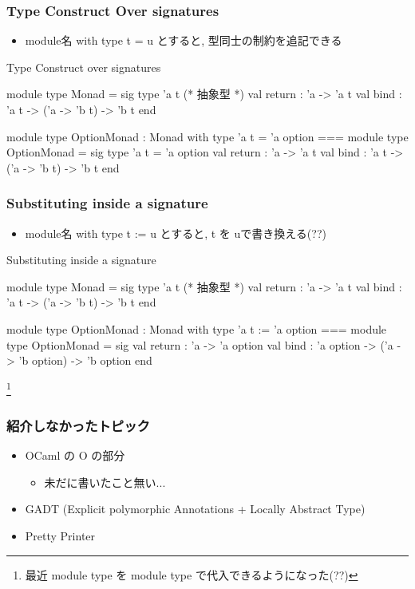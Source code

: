 \documentclass[dvipdfmx,14pt,notheorems,aspectratio=169]{beamer}
\theoremstyle{definition}
\begin{document}
    \begin{frame}[fragile]\frametitle{Type Construct Over signatures}
        \begin{itemize}
            \item module名 with type t = u とすると, 型同士の制約を追記できる
        \end{itemize}
        \begin{exampleblock}{Type Construct over signatures}
            \scriptsize
            \begin{verbatimtab}
module type Monad = sig
    type 'a t (* 抽象型 *)
    val return : 'a -> 'a t
    val bind : 'a t -> ('a -> 'b t) -> 'b t
end

module type OptionMonad : Monad with type 'a t = 'a option
===
module type OptionMonad =
  sig
    type 'a t = 'a option
    val return : 'a -> 'a t
    val bind : 'a t -> ('a -> 'b t) -> 'b t
  end
            \end{verbatimtab}
        \end{exampleblock}
    \end{frame}


    \begin{frame}[fragile]\frametitle{Substituting inside a signature}
        \begin{itemize}
            \item module名 with type t := u とすると, t を uで書き換える(??)
        \end{itemize}
        \begin{exampleblock}{Substituting inside a signature}
            \scriptsize
            \begin{verbatimtab}
module type Monad = sig
    type 'a t (* 抽象型 *)
    val return : 'a -> 'a t
    val bind : 'a t -> ('a -> 'b t) -> 'b t
end

module type OptionMonad : Monad with type 'a t := 'a option
===
module type OptionMonad =
  sig
    val return : 'a -> 'a option
    val bind : 'a option -> ('a -> 'b option) -> 'b option
  end
            \end{verbatimtab}
        \end{exampleblock}
        \footnote{最近 module type を module type で代入できるようになった(??)}
    \end{frame}

    \begin{frame}[fragile]\frametitle{紹介しなかったトピック}
        \begin{itemize}
            \item OCaml の O の部分
            \begin{itemize}
                \item 未だに書いたこと無い...
            \end{itemize}
            \item GADT (Explicit polymorphic Annotations + Locally Abstract Type)
            \item Pretty Printer
        \end{itemize}
    \end{frame}
\end{document}
